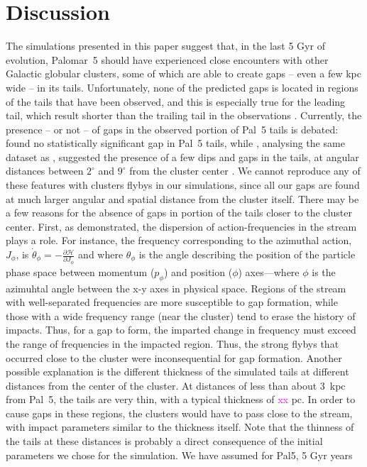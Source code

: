 \documentclass[draft]{aa}
\newcommand{\paola}[1]{\textcolor{magenta}{{#1}}}
\begin{document}
  
  
\section{Discussion}
  
  The simulations presented in this paper suggest that, in the last 5 Gyr of evolution, Palomar~5 should have experienced close encounters with other Galactic globular clusters, some of which are able to create gaps -- even a few kpc wide -- in its tails. Unfortunately, none of the predicted gaps is located in regions of the tails that have been observed, and this is especially true for the leading tail, which result shorter than the trailing tail in the observations \citep[see][for a possible explanation of this feature]{2017NatAs...1..633P}. Currently, the presence -- or not -- of gaps in the observed portion of Pal~5 tails is debated: \citet{2016ApJ...819....1I} found no statistically significant gap in Pal~5 tails, while \citet{2017MNRAS.470...60E}, analysing the same dataset as \citet{2016ApJ...819....1I}, suggested the presence of a few dips and gaps in the tails, at angular distances between $2^\circ$ and $9^\circ$ from the cluster center \citep[see also][]{ 2020ApJ...889...70B}. We cannot reproduce any of these features with clusters flybys in our simulations, since all our gaps are found at much larger angular and spatial distance from the cluster itself. There may be a few reasons for the absence of gaps in portion of the tails closer to the cluster center. First, as \citet{2016MNRAS.457.3817S} demonstrated, the dispersion of action-frequencies in the stream plays a role. For instance, the frequency corresponding to the azimuthal action, $J_\phi$, is $\dot\theta_\phi = - \frac{\mathcal{\partial H}}{\partial J_\phi}$ and where $\theta_\phi$ is the angle describing the position of the particle phase space between momentum ($p_\phi$) and position ($\phi$) axes---where $\phi$ is the azimuhtal angle between the x-y axes in physical space. Regions of the stream with well-separated frequencies are more susceptible to gap formation, while those with a wide frequency range (near the cluster) tend to erase the history of impacts. Thus, for a gap to form, the imparted change in frequency must exceed the range of frequencies in the impacted region. Thus, the strong flybys that occurred close to the cluster were inconsequential for gap formation. Another possible explanation is the different thickness of the simulated tails at different distances from the center of the cluster. At distances of less than about 3~kpc from Pal~5, the tails are very thin, with a typical thickness of \paola{xx} pc. In order to cause gaps in these regions, the clusters would have to pass close to the stream, with impact parameters similar to the thickness itself. Note that the thinness of the tails at these distances is probably a direct consequence of the initial parameters we chose for the simulation. We have assumed for Pal5, 5 Gyr years 
\end{document}
